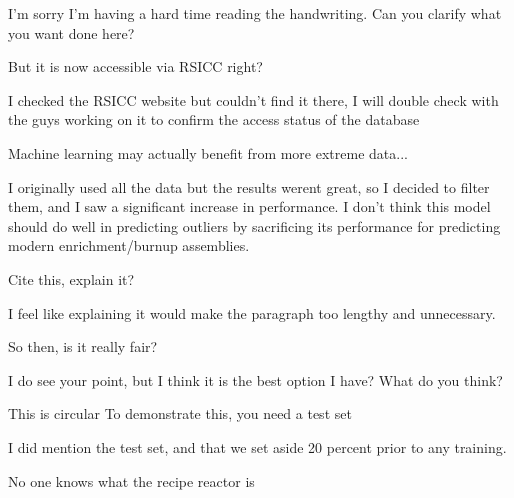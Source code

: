 \documentclass[answers,11pt]{exam}
\begin{document}
\begin{questions}
        \begin{solution}
            I'm sorry I'm having a hard time reading the handwriting.
            Can you clarify what you want done here?
        \end{solution}

        \question
        But it is now accessible via RSICC right?

        \begin{solution}
            I checked the RSICC website but couldn't find it there,
            I will double check with the guys working on it to
            confirm the access status of the database
        \end{solution}

        \question
        Machine learning may actually benefit from more extreme data...

        \begin{solution}
            I originally used all the data but the results werent
            great, so I decided to filter them, and I saw a significant
            increase in performance. I don't think this model should
            do well in predicting outliers by sacrificing its performance
            for predicting modern enrichment/burnup assemblies.
        \end{solution}


        \question
        Cite this, explain it?

        \begin{solution}
            I feel like explaining it would make the paragraph too
            lengthy and unnecessary. 
        \end{solution}


        \question
        So then, is it really fair?

        \begin{solution}
            I do see your point, but I think it is the best
            option I have? What do you think?
        \end{solution}

        \question
        This is circular
        To demonstrate this, you need a test set

        \begin{solution}
        I did mention the test set, and that we set aside
        20 percent prior to any training.
        \end{solution}

        \question
        No one knows what the recipe reactor is


\end{questions}
\end{document}
